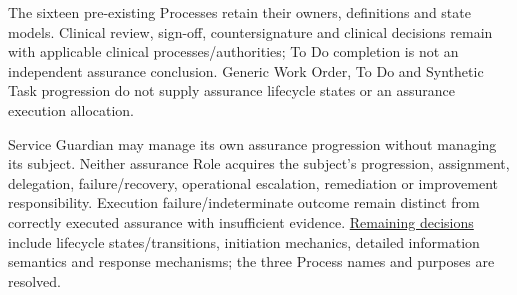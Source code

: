 \label{rad:processes:414}

The sixteen pre-existing Processes retain their owners, definitions and state models. Clinical review, sign-off, countersignature and clinical decisions remain with applicable clinical processes/\allowbreak{}authorities; To Do completion is not an independent assurance conclusion. Generic Work Order, To Do and Synthetic Task progression do not supply assurance lifecycle states or an assurance execution allocation.

\label{rad:processes:416}

Service Guardian may manage its own assurance progression without managing its subject. Neither assurance Role acquires the subject's progression, assignment, delegation, failure/\allowbreak{}recovery, operational escalation, remediation or improvement responsibility. Execution failure/\allowbreak{}indeterminate outcome remain distinct from correctly executed assurance with insufficient evidence. \hyperref[rad:assurance:214]{Remaining decisions} include lifecycle states/\allowbreak{}transitions, initiation mechanics, detailed information semantics and response mechanisms; the three Process names and purposes are resolved.

